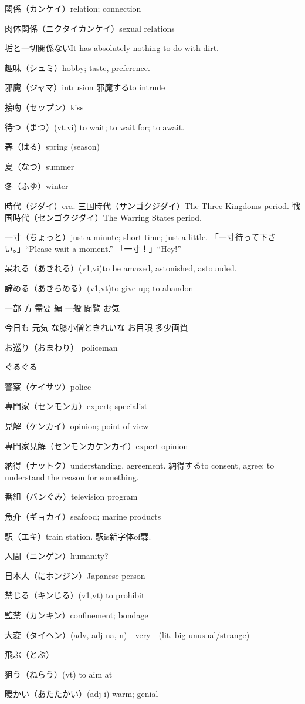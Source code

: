 関係（カンケイ）relation; connection

肉体関係（ニクタイカンケイ）sexual relations

垢と一切関係ないIt has absolutely nothing to do with dirt.

趣味（シュミ）hobby; taste, preference.

邪魔（ジャマ）intrusion
邪魔するto intrude

接吻（セップン）kiss

待つ（まつ）(vt,vi) to wait; to wait for; to await.

春（はる）spring (season)

夏（なつ）summer

冬（ふゆ）winter

時代（ジダイ）era.
三国時代（サンゴクジダイ）The Three Kingdoms period.
戦国時代（センゴクジダイ）The Warring States period.

一寸（ちょっと）just a minute; short time; just a little.
「一寸待って下さい。」``Please wait a moment.''
「一寸！」``Hey!''

呆れる（あきれる）(v1,vi)to be amazed, astonished, astounded.

諦める（あきらめる）(v1,vt)to give up; to abandon

一部
方
需要
編
一般
閲覧
お気

今日も
元気
な膝小僧ときれいな
お目眼
多少画質

お巡り（おまわり）
policeman

ぐるぐる

警察（ケイサツ）police

専門家（センモンカ）expert; specialist

見解（ケンカイ）opinion; point of view

専門家見解（センモンカケンカイ）expert opinion

納得（ナットク）understanding, agreement.
納得するto consent, agree; to understand the reason for something.

番組（バンぐみ）television program

魚介（ギョカイ）seafood; marine products

駅（エキ）train station. 駅is新字体of驛.

人間（ニンゲン）humanity?

日本人（にホンジン）Japanese person

禁じる（キンじる）(v1,vt) to prohibit

監禁（カンキン）confinement; bondage


大変（タイヘン）(adv, adj-na, n)　very　(lit. big unusual/strange)

飛ぶ（とぶ）

狙う（ねらう）(vt) to aim at

暖かい（あたたかい）(adj-i) warm; genial
